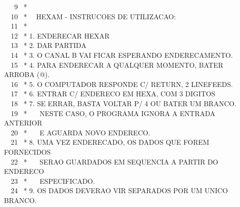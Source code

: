 \documentclass[a4paper,12pt]{article}
\begin{document}
\phantom \ \ \ 9 \ *\\
\phantom \ \ 10 \ * \ \ HEXAM - INSTRUCOES DE UTILIZACAO:\\
\phantom \ \ 11 \ *\\
\phantom \ \ 12 \ * 1. ENDERECAR HEXAR\\
\phantom \ \ 13 \ * 2. DAR PARTIDA\\
\phantom \ \ 14 \ * 3. O CANAL B VAI FICAR ESPERANDO ENDERECAMENTO.\\
\phantom \ \ 15 \ * 4. PARA ENDERECAR A QUALQUER MOMENTO, BATER ARROBA (@).\\
\phantom \ \ 16 \ * 5. O COMPUTADOR RESPONDE C/ RETURN, 2 LINEFEEDS.\\
\phantom \ \ 17 \ * 6. ENTRAR C/ ENDERECO EM HEXA, COM 3 DIGITOS\\
\phantom \ \ 18 \ * 7. SE ERRAR, BASTA VOLTAR P/ 4 OU BATER UM BRANCO.\\
\phantom \ \ 19 \ * \ \ \ NESTE CASO, O PROGRAMA IGNORA A ENTRADA ANTERIOR\\
\phantom \ \ 20 \ * \ \ \ E AGUARDA NOVO ENDERECO.\\
\phantom \ \ 21 \ * 8. UMA VEZ ENDERECADO, OS DADOS QUE FOREM FORNECIDOS\\
\phantom \ \ 22 \ * \ \ \ SERAO GUARDADOS EM SEQUENCIA A PARTIR DO ENDERECO\\
\phantom \ \ 23 \ * \ \ \ ESPECIFICADO.\\
\phantom \ \ 24 \ * 9. OS DADOS DEVERAO VIR SEPARADOS POR UM UNICO BRANCO.

\newpage

\noindent \\
\end{document}
